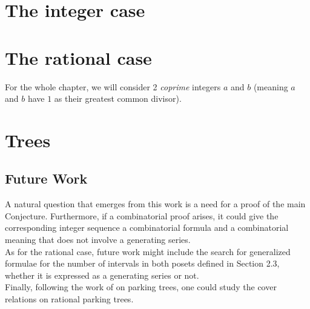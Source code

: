 \documentclass[12pt]{report}
\begin{document}
\tableofcontents

\chapter{The integer case}





\chapter{The rational case}

For the whole chapter, we will consider 2 \emph{coprime}
integers $a$ and $b$ (meaning $a$ and $b$ have $1$ as their
greatest common divisor).





\chapter{Trees}




\section*{Future Work}

A natural question that emerges from this work is a need
for a proof of the main Conjecture.
Furthermore, if a combinatorial proof arises, it could give
the corresponding integer sequence a combinatorial formula
and a combinatorial meaning that does not involve a 
generating series.\\

As for the rational case, future work might include the search
for generalized formulae for the number of intervals in both
posets defined in Section 2.3, whether it is expressed as a
generating series or not.\\

Finally, following the work of \cite{ref9} on parking trees,
one could study the cover relations on rational parking trees. 



\end{document}
